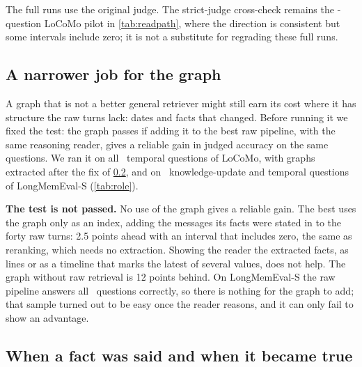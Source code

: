 \documentclass[11pt,letterpaper]{article}
\newcommand{\pipe}[1]{\texttt{#1}}
\begin{document}
The full runs use the original judge. The strict-judge cross-check remains the \numReadQuestions-question LoCoMo pilot in \cref{tab:readpath}, where the direction is consistent but some intervals include zero; it is not a substitute for regrading these full runs.

\subsection{A narrower job for the graph}
\label{sec:role}

A graph that is not a better general retriever might still earn its cost where it has structure the raw turns lack: dates and facts that changed. Before running it we fixed the test: the graph passes if adding it to the best raw pipeline, with the same reasoning reader, gives a reliable gain in judged accuracy on the same questions. We ran it on all \numRoleQuestions\ temporal questions of LoCoMo, with graphs extracted after the fix of \cref{sec:dates}, and on \numRoleLmeQuestions\ knowledge-update and temporal questions of LongMemEval-S (\cref{tab:role}).

\begin{table}[ht]
\centering
\caption{The narrower test. LoCoMo, \numRoleQuestions\ temporal questions: judged accuracy and paired difference from \pipe{dense-wide-reason} under each judge. Last column: judged accuracy on \numRoleLmeQuestions\ LongMemEval-S questions.}
\label{tab:role}
\small
\resizebox{\textwidth}{!}{}
\end{table}

\textbf{The test is not passed.} No use of the graph gives a reliable gain. The best uses the graph only as an index, adding the messages its facts were stated in to the forty raw turns: 2.5 points ahead with an interval that includes zero, the same as reranking, which needs no extraction. Showing the reader the extracted facts, as lines or as a timeline that marks the latest of several values, does not help. The graph without raw retrieval is 12 points behind. On LongMemEval-S the raw pipeline answers all \numRoleLmeQuestions\ questions correctly, so there is nothing for the graph to add; that sample turned out to be easy once the reader reasons, and it can only fail to show an advantage.

\subsection{When a fact was said and when it became true}
\label{sec:dates}
\end{document}
